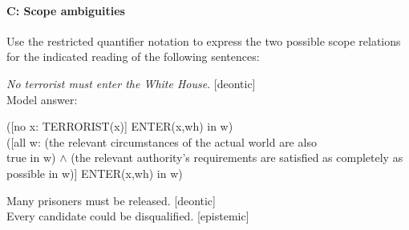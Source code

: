 {\paragraph*{C: Scope ambiguities}

Use the restricted quantifier notation to express the two possible scope relations for the indicated reading of the following sentences:

\ea 
\ea  \textit{No terrorist must enter the White House}.  [deontic]\\
Model answer:\\
\begin{xlisti} \ex{}   ([no x: TERRORIST(x)] ENTER(x,wh) in w)\\
\ex\relax [no x: TERRORIST(x)] ([all w: (the relevant circumstances of the actual world are also \\
  true in w) $\wedge$ (the relevant authority’s requirements are satisfied as completely as \\
  possible in w)] ENTER(x,wh) in w)
\end{xlisti}
\ex Many prisoners must be released.  [deontic]\\
\ex Every candidate could be disqualified.  [epistemic]
\z
\z
{}

}
